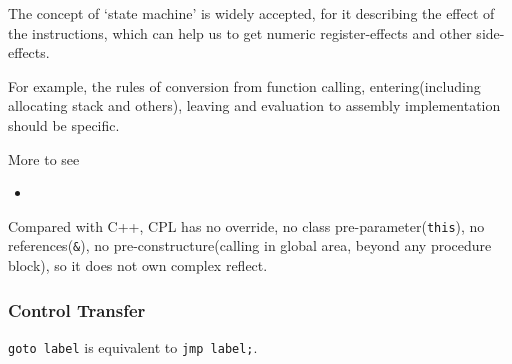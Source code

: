 
The concept of `state machine' is widely accepted, for it describing the effect of the instructions, which can help us to get numeric register-effects and other side-effects.

For example, the rules of conversion from function calling, entering(including allocating stack and others), leaving and evaluation to assembly implementation should be specific.

More to see
\begin{itemize}
	\item {}
\end{itemize}

Compared with C++, CPL has
no override,
no class pre-parameter(\verb`this`), 
no references(\verb`&`),
no pre-constructure(calling in global area, beyond any procedure block), %
so it does not own complex reflect.

\subsubsection{Control Transfer}

\verb`goto label` is equivalent to \verb`jmp label;`.

